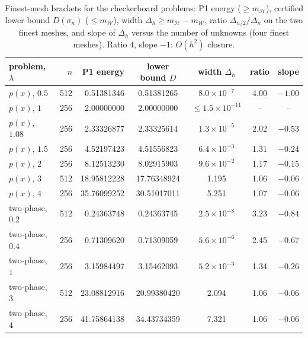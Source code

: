 \documentclass[11pt]{amsart}
\theoremstyle{definition}
\theoremstyle{remark}
\numberwithin{equation}{section}
\newcommand{\mW}{m_{\mathcal W}}
\newcommand{\mH}{m_{\mathcal H}}
\begin{document}
\begin{table}[t]
\caption{Finest-mesh brackets for the checkerboard problems: P1 energy ($\ge\mH$), certified lower bound $D(\sigma_n)$ ($\le\mW$), width $\Delta_h\ge\mH-\mW$, ratio $\Delta_{n/2}/\Delta_n$ on the two finest meshes, and slope of $\Delta_h$ versus the number of unknowns (four finest meshes). Ratio $4$, slope $-1$: $O(h^2)$ closure.}\label{tab:brackets}
\small
\begin{tabular}{@{}lrrcccc@{}}
\toprule
problem, $\lambda$ & $n$ & P1 energy & lower bound $D$ & width $\Delta_h$ & ratio & slope\\
\midrule
$p(x)$, $0.5$ & 512 & 0.51381346 & 0.51381265 & $8.0\times10^{-7}$ & 4.00 & $-1.00$\\
$p(x)$, $1$ & 256 & 2.00000000 & 2.00000000 & $\le1.5\times10^{-11}$ & -- & --\\
$p(x)$, $1.08$ & 256 & 2.33326877 & 2.33325614 & $1.3\times10^{-5}$ & 2.02 & $-0.53$\\
$p(x)$, $1.5$ & 256 & 4.52197423 & 4.51556823 & $6.4\times10^{-3}$ & 1.31 & $-0.24$\\
$p(x)$, $2$ & 256 & 8.12513230 & 8.02915903 & $9.6\times10^{-2}$ & 1.17 & $-0.15$\\
$p(x)$, $3$ & 512 & 18.95812228 & 17.76348924 & 1.195 & 1.06 & $-0.06$\\
$p(x)$, $4$ & 256 & 35.76099252 & 30.51017011 & 5.251 & 1.07 & $-0.06$\\
\midrule
two-phase, $0.2$ & 512 & 0.24363748 & 0.24363745 & $2.5\times10^{-8}$ & 3.23 & $-0.84$\\
two-phase, $0.4$ & 256 & 0.71309620 & 0.71309059 & $5.6\times10^{-6}$ & 2.45 & $-0.67$\\
two-phase, $1$ & 256 & 3.15984497 & 3.15462093 & $5.2\times10^{-3}$ & 1.34 & $-0.26$\\
two-phase, $3$ & 512 & 23.08812916 & 20.99380420 & 2.094 & 1.06 & $-0.06$\\
two-phase, $4$ & 256 & 41.75864138 & 34.43734359 & 7.321 & 1.06 & $-0.06$\\
\bottomrule
\end{tabular}
\end{table}
\end{document}
